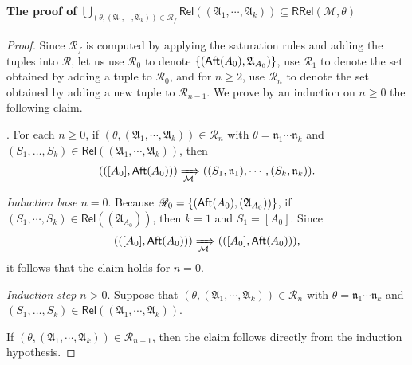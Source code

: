 \documentclass[preprint,12pt]{elsarticle}
\newtheorem{lemma}[theorem]{Lemma}
\newcommand\Mm{{\mathcal{M} }}
\newcommand\aft{{\sf Aft}}
\newcommand\conf{{\mathsf{Conf} }}
\newcommand\aname{\mathfrak{n}}
\newcommand\AutReach{\mathscr{R}}
\newcommand\RRel{\mathsf{RRel}}
\newcommand\Rel{\mathsf{Rel}}
\newcommand\Aut{{\mathfrak{A} }}
\newcommand\ConfSet{{\mathscr{C} }}
\begin{document}
\paragraph*{The proof of $\bigcup \limits_{(\theta, (\Aut_1, \cdots, \Aut_k)) \in \AutReach_f}  \Rel((\Aut_1, \cdots, \Aut_k)) \subseteq \RRel(\Mm, \theta)$}


\begin{proof}
Since $\AutReach_f$ is computed by applying the saturation rules and adding the tuples into $\AutReach$,  let us use $\AutReach_0$ to denote $\{(\aft(A_0), \Aut_{A_0})\}$, use $\AutReach_1$ to denote the set obtained by adding a tuple to $\AutReach_0$, and for $n \ge 2$, use $\AutReach_n$ to denote the set obtained by adding a new tuple to $\AutReach_{n-1}$. 
We prove by an induction on $n \ge 0$ the following claim.  

\smallskip
{}. For each $n \ge 0$, if $(\theta, (\Aut_1, \cdots, \Aut_k)) \in \AutReach_n$ with $\theta = \aname_1 \cdots \aname_k$ and $(S_1,\dots,S_k) \in \Rel((\Aut_1, \cdots, \Aut_k))$, then 
%
$$(([A_0], \aft(A_0))) \xRightarrow[\Mm]{} ((S_1, \aname_1), \cdots, (S_k, \aname_k)).$$

\smallskip



\noindent \emph{Induction base $n = 0$}. 
Because $\AutReach_0 = \{(\aft(A_0),(\Aut_{A_0}))\}$, if $(S_1, \cdots, S_k) \in \Rel((\Aut_{A_0}))$, then $k=1$ and $S_1 = [A_0]$. Since 
$$(([A_0], \aft(A_0))) \xRightarrow[\Mm]{} (([A_0], \aft(A_0))),$$ 
%
it follows that the claim holds for $n = 0$. 

\smallskip

\noindent \emph{Induction step $n > 0$}. 
Suppose that $(\theta, (\Aut_1, \cdots, \Aut_k)) \in \AutReach_n$ with $\theta = \aname_1 \cdots \aname_k$ and $(S_1,\dots,S_k) \in \Rel((\Aut_1, \cdots, \Aut_k))$. 

If $(\theta, (\Aut_1, \cdots, \Aut_k)) \in \AutReach_{n-1}$, then the claim follows directly from the induction hypothesis. 


\end{proof}
\end{document}
